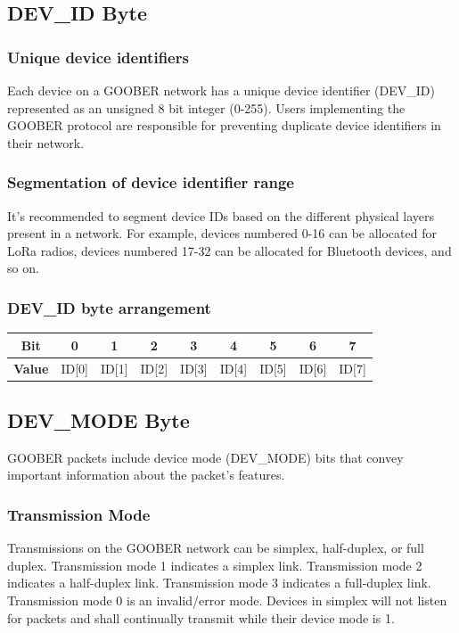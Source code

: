 \documentclass{article}
\begin{document}
    \subsection{DEV\_ID Byte}
    
    \subsubsection{Unique device identifiers}
    Each device on a GOOBER network has a unique device identifier (DEV\_ID) represented as an unsigned 8 bit integer (0-255). Users implementing the GOOBER protocol are responsible for preventing duplicate device identifiers in their network.
    
    \subsubsection{Segmentation of device identifier range}
    It's recommended to segment device IDs based on the different physical layers present in a network. For example, devices numbered 0-16 can be allocated for LoRa radios, devices numbered 17-32 can be allocated for Bluetooth devices, and so on.

    \subsubsection{DEV\_ID byte arrangement}
    \begin{table}[h]
        \centering
        \begin{tabular}{|c|c|c|c|c|c|c|c|c|}
            \hline
            \textbf{Bit}   & 0     & 1     & 2     & 3     & 4     & 5     & 6     & 7     \\
            \hline
            \textbf{Value} & ID[0] & ID[1] & ID[2] & ID[3] & ID[4] & ID[5] & ID[6] & ID[7] \\
            \hline
        \end{tabular}
    \end{table}

    \subsection{DEV\_MODE Byte}
    GOOBER packets include device mode (DEV\_MODE) bits that convey important information about the packet's features.
    
    \subsubsection{Transmission Mode}
    Transmissions on the GOOBER network can be simplex, half-duplex, or full duplex. Transmission mode 1 indicates a simplex link. Transmission mode 2 indicates a half-duplex link. Transmission mode 3 indicates a
    full-duplex link. Transmission mode 0 is an invalid/error mode. Devices in simplex will not listen for packets and shall continually transmit while their device mode is 1.
\end{document}

